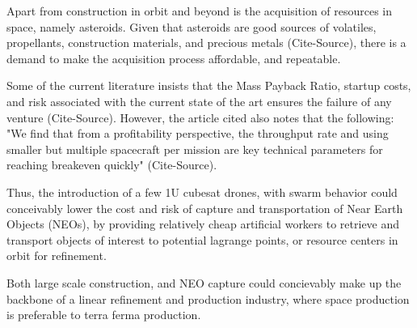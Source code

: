 Apart from construction in orbit and beyond is the acquisition of
resources in space, namely asteroids. Given that asteroids are good
sources of volatiles, propellants, construction materials, and
precious metals (Cite-Source), there is a demand to make the
acquisition process affordable, and repeatable.

Some of the current literature insists that the Mass Payback Ratio,
startup costs, and risk associated with the current state of the art
ensures the failure of any venture (Cite-Source). However, the article
cited also notes that the following: "We find that from a
profitability perspective, the throughput rate and using smaller but
multiple spacecraft per mission are key technical parameters for
reaching breakeven quickly" (Cite-Source).

Thus, the introduction of a few 1U cubesat drones, with swarm behavior
could conceivably lower the cost and risk of capture and
transportation of Near Earth Objects (NEOs), by providing relatively
cheap artificial workers to retrieve and transport objects of interest
to potential lagrange points, or resource centers in orbit for
refinement.

Both large scale construction, and NEO capture could concievably make
up the backbone of a linear refinement and production industry, where
space production is preferable to terra ferma production.
